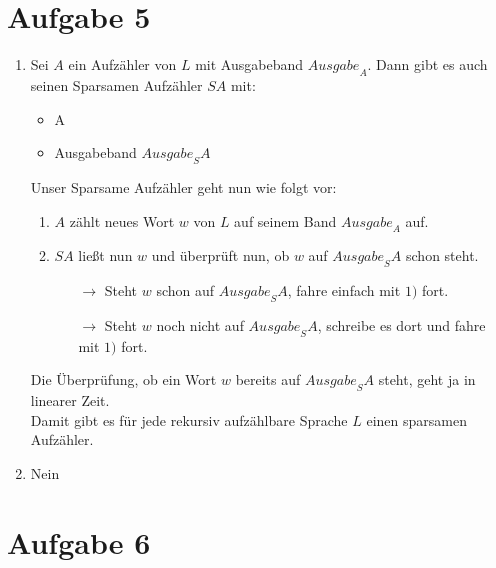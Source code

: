 \documentclass[a4paper,11pt]{scrartcl}
\begin{document}
	
	\section*{Aufgabe 5}
	\begin{enumerate}[label=(\alph*)]
	\item	Sei $A$ ein Aufzähler von $L$ mit Ausgabeband ${Ausgabe}_A$. Dann gibt es auch seinen Sparsamen Aufzähler $SA$ mit:
			\begin{itemize}
			\item A
			\item Ausgabeband ${Ausgabe}_SA$
			\end{itemize}
			Unser Sparsame Aufzähler geht nun wie folgt vor:
			\begin{enumerate}[label=\arabic*)]
			\item $A$ zählt neues Wort $w$ von $L$ auf seinem Band ${Ausgabe}_A$ auf.
			\item $SA$ ließt nun $w$ und überprüft nun, ob $w$ auf ${Ausgabe}_SA$ schon steht.
				\begin{itemize}
				\item[$\rightarrow$] Steht $w$ schon auf ${Ausgabe}_SA$, fahre einfach mit $1)$ fort.
				\item[$\rightarrow$] Steht $w$ noch nicht auf ${Ausgabe}_SA$, schreibe es dort und fahre mit $1)$ fort.
				\end{itemize}
			\end{enumerate}
			Die Überprüfung, ob ein Wort $w$ bereits auf ${Ausgabe}_SA$ steht, geht ja in linearer Zeit.\\
			Damit gibt es für jede rekursiv aufzählbare Sprache $L$ einen sparsamen Aufzähler.
	
	\item	Nein
	\end{enumerate}
	
	
	\section*{Aufgabe 6}
\end{document}
